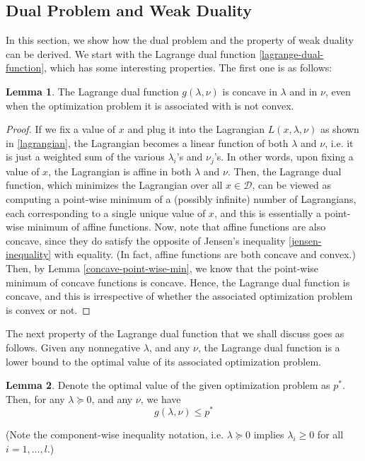 \documentclass[a4paper]{article}
\theoremstyle{definition}
\newtheorem{lemma}{Lemma}[subsection]
\begin{document}
\subsection{Dual Problem and Weak Duality}
\label{derivation-duality}

In this section, we show how the dual problem and the property of weak duality can be derived.
We start with the Lagrange dual function \eqref{lagrange-dual-function}, which has some interesting properties.
The first one is as follows:
\begin{lemma}
	\label{dual-function-concave}
	The Lagrange dual function $g(\lambda, \nu)$ is concave in $\lambda$ and in $\nu$, even when the optimization problem it is associated with is not convex.
\end{lemma}
\begin{proof}
	If we fix a value of $x$ and plug it into the Lagrangian $L(x, \lambda, \nu)$ as shown in \eqref{lagrangian}, the Lagrangian becomes a linear function of both $\lambda$ and $\nu$, i.e. it is just a weighted sum of the various $\lambda_i$'s and $\nu_j$'s.
	In other words, upon fixing a value of $x$, the Lagrangian is affine in both $\lambda$ and $\nu$.
	Then, the Lagrange dual function, which minimizes the Lagrangian over all $x \in \mathcal{D}$, can be viewed as computing a point-wise minimum of a (possibly infinite) number of Lagrangians, each corresponding to a single unique value of $x$, and this is essentially a point-wise minimum of affine functions.
	Now, note that affine functions are also concave, since they do satisfy the opposite of Jensen's inequality \eqref{jensen-inequality} with equality.
	(In fact, affine functions are both concave and convex.)
	Then, by Lemma \ref{concave-point-wise-min}, we know that the point-wise minimum of concave functions is concave.
	Hence, the Lagrange dual function is concave, and this is irrespective of whether the associated optimization problem is convex or not.
\end{proof}

The next property of the Lagrange dual function that we shall discuss goes as follows.
Given any nonnegative $\lambda$, and any $\nu$, the Lagrange dual function is a lower bound to the optimal value of its associated optimization problem.

\begin{lemma}
	\label{dual-function-lower-bound}
	Denote the optimal value of the given optimization problem as $p^*$.
	Then, for any $\lambda \succeq 0$, and any $\nu$, we have
	\begin{equation*}
		g(\lambda, \nu) \leq p^*
	\end{equation*}
\end{lemma}
(Note the component-wise inequality notation, i.e. $\lambda \succeq 0$ implies $\lambda_i \geq 0$ for all $i = 1, \dots, l$.)
\end{document}
